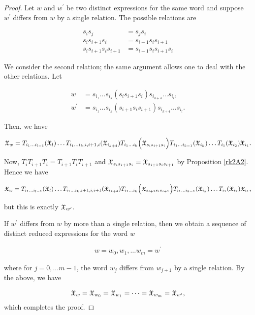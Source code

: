 \documentclass[a4 paper, 10pt]{article}
\begin{document}
\begin{proof} Let $w$ and $w^{\prime}$ be two distinct expressions for the same word and suppose $w^{\prime}$ differs from $w$ by a single relation. The possible relations are

\begin{align*}
	s_is_j &= s_js_i\\
	s_is_{i+1}s_i &= s_{i+1}s_is_{i+1}\\
	s_is_{i+1}s_is_{i+1} &= s_{i+1}s_is_{i+1}s_i
\end{align*}

We consider the second relation; the same argument allows one to deal with the other relations. Let

\begin{align*}
 w &= s_{i_1} \dots s_{i_k} (s_is_{i+1}s_i) s_{i_{k+4}} \dots s_{i_l},\\
 w^{\prime} &= s_{i_1} \dots s_{i_k} (s_{i+1}s_{i}s_{i+1}) s_{i_{k+4}} \dots s_{i_l}.
\end{align*}

Then, we have

\begin{align*}
 \mathfrak{X}_w = T_{i_1 \dots i_{l-1}}(\mathfrak{X}_l) \dots T_{i_1 \dots i_k,i,i+1,i}(\mathfrak{X}_{i_{k+4}}) T_{i_1 \dots i_k}\Big(\mathfrak{X}_{s_is_{i+1}s_i} \Big) T_{i_1 \dots i_{k-1}}(\mathfrak{X}_{i_k}) \dots T_{i_1}(\mathfrak{X}_{i_2}) \mathfrak{X}_{i_1}.
\end{align*}

Now, $T_{i}T_{i+1}T_{i} = T_{i+1}T_{i}T_{i+1}$ and $\mathfrak{X}_{s_is_{i+1}s_i} = \mathfrak{X}_{s_{i+1}s_is_{i+1}}$ by Proposition \ref{rk2A2}. Hence we have

\begin{align*}
  \mathfrak{X}_w = T_{i_1 \dots i_{l-1}}(\mathfrak{X}_l) \dots T_{i_1 \dots i_k,i+1,i,i+1}(\mathfrak{X}_{i_{k+4}}) T_{i_1 \dots i_k}\Big( \mathfrak{X}_{s_{i+1}s_is_{i+1}} \Big) T_{i_1 \dots i_{k-1}}(\mathfrak{X}_{i_k}) \dots T_{i_1}(\mathfrak{X}_{i_2}) \mathfrak{X}_{i_1},
\end{align*} 

but this is exactly $\mathfrak{X}_{w^{\prime}}$.

If $w^{\prime}$ differs from $w$ by more than a single relation, then we obtain a sequence of distinct reduced expressions for the word $w$

\begin{align*}
 w = w_0, w_1, \dots w_m = w^{\prime}
\end{align*}

where for $j = 0, \dots m-1$, the word $w_j$ differs from $w_{j+1}$ by a single relation. By the above, we have

\begin{align*}
 \mathfrak{X}_w = \mathfrak{X}_{w_0} = \mathfrak{X}_{w_1} = \dots = \mathfrak{X}_{w_m} = \mathfrak{X}_{w^{\prime}},
\end{align*}
which completes the proof.

\end{proof}
\end{document}
